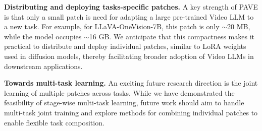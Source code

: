 
\medskip
\noindent \textbf{Distributing and deploying tasks-specific patches.} A key strength of PAVE is that only a small patch is need for adapting a large pre-trained Video LLM to a new task. For example, for LLaVA-OneVision-7B, this patch is only $\sim$20 MB, while the model occupies $\sim$16 GB. We anticipate that this compactness makes it practical to distribute and deploy individual patches, similar to LoRA weights used in diffusion models, thereby facilitating broader adoption of Video LLMs in downstream applications.

\medskip
\noindent \textbf{Towards multi-task learning.} An exciting future research direction is the joint learning of multiple patches across tasks. While we have demonstrated the feasibility of stage-wise multi-task learning, future work should aim to handle multi-task joint training and explore methods for combining individual patches to enable flexible task composition. 



